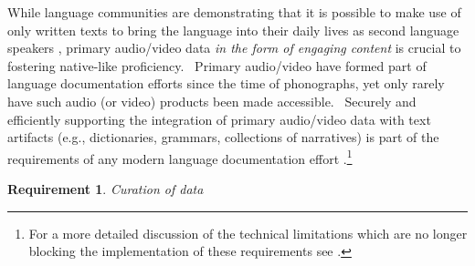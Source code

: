\documentclass[11pt]{article}
\newcommand{\smalltodo}[2][]
    {\todo[caption={#2}, #1]
    {\tiny#2\normalsize}}
\newtheorem{requirement}{Requirement}
\begin{document}
While language communities are demonstrating that it is possible to make use of
only written texts to bring the language into their daily lives as second
language speakers \cite{Ironstrack:2012}, primary audio/video data \emph{in the
form of engaging content} is crucial to fostering native-like proficiency.
~Primary audio/video  have formed part of  language documentation efforts since
the time of phonographs, yet only rarely have such audio (or video) products been
made accessible. %
~Securely and efficiently supporting the integration of primary audio/video data
with text artifacts (e.g., dictionaries, grammars, collections of narratives)
is part of the requirements of any modern language documentation effort
\cite{Schroeter:2006} \cite{Good:2012b}.\footnote{For a more detailed discussion of the technical limitations which are no longer blocking the implementation of these requirements see \cite{lingsync:2012}. } 
 




\begin{requirement}
	\label{req:curation}
       Curation of data
\end{requirement}
\end{document}
